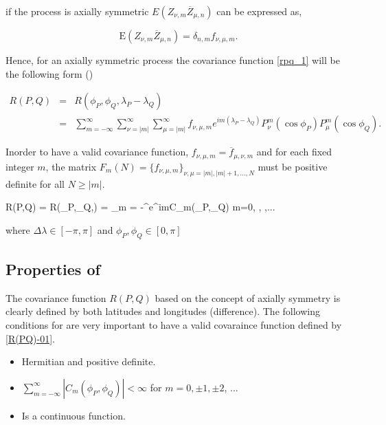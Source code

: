 		if the process is axially symmetric $E(Z_{\nu,m} \overline{Z}_{\mu,n})$ can be expressed as,
		
		\[
			\mbox{E} (Z_{\nu,m} \overline{Z}_{\mu,n}) = \delta_{n,m} f_{\nu,\mu,m}.
		\]
			
		Hence, for an axially symmetric process the covariance function \ref{rpq_1} will be the following form (\cite{Huang2012}) 
			
		\begin{eqnarray} \label{axially-symmetry-cov}
			R(P,Q)  & = & R(\phi_P, \phi_Q, \lambda_P-\lambda_Q) \nonumber \\
			& = & \sum_{m=-\infty}^{\infty} \sum_{\nu=|m|}^\infty \sum_{\mu=|m|}^\infty f_{\nu,\mu,m} e^{im (\lambda_P-\lambda_Q)} P_{\nu}^m(\cos \phi_P) P_{\mu}^m (\cos \phi_Q) .
		\end{eqnarray}
			
		Inorder to have a valid covariance function, $f_{\nu,\mu, m} = \overline{f}_{\mu, \nu, m}$ and for each fixed integer $m$, the matrix $F_m(N) = \{ f_{\nu,\mu,m} \}_{\nu,\mu=|m|,|m|+1, \ldots, N }$ must be positive definite for all $N \ge |m|$. 
		
		\beq \label{R(PQ)-01}
		R(P,Q) = R(\phi_P,\phi_Q,\Delta\lambda) = \sum_{m = -\infty}^{\infty}e^{im\Delta\lambda}C_m(\phi_P,\phi_Q) \quad m=0, , ,...
		\eeq
		
		where $\Delta\lambda \in [-\pi, \pi]$ and $\phi_P, \phi_Q \in [0,\pi]$
		\subsection{Properties of \Cm}
			
		The covariance function $R(P,Q)$ based on the concept of axially symmetry is clearly defined by both latitudes and longitudes (difference). The following conditions for \Cm are very important to have a valid covaraince function defined by \ref{R(PQ)-01}.  
			
		\begin{itemize}
			\item Hermitian and positive definite.
			\item $\sum_{m = -\infty}^{\infty}|C_m(\phi_P,\phi_Q)|<\infty$ for $m=0,\pm 1, \pm  2$, ...
			\item Is a continuous function. 
		\end{itemize}
		
